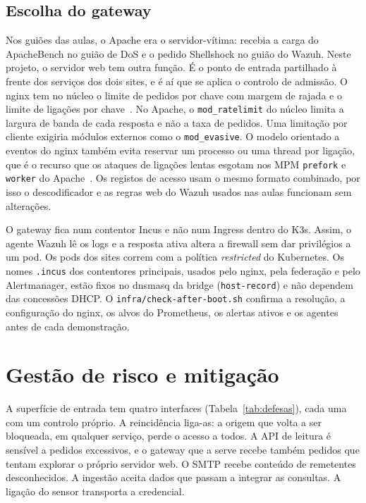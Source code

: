 \documentclass[conference,a4paper]{IEEEtran}
\newcommand{\code}[1]{\texttt{\small #1}}
\begin{document}
\subsection{Escolha do gateway}
Nos guiões das aulas, o Apache era o servidor-vítima: recebia a carga do ApacheBench no guião de DoS e o pedido Shellshock no guião do Wazuh. Neste projeto, o servidor web tem outra função. É o ponto de entrada partilhado à frente dos serviços dos dois sites, e é aí que se aplica o controlo de admissão. O nginx tem no núcleo o limite de pedidos por chave com margem de rajada e o limite de ligações por chave~\cite{nginx}. No Apache, o \code{mod\_ratelimit} do núcleo limita a largura de banda de cada resposta e não a taxa de pedidos. Uma limitação por cliente exigiria módulos externos como o \code{mod\_evasive}. O modelo orientado a eventos do nginx também evita reservar um processo ou uma thread por ligação, que é o recurso que os ataques de ligações lentas esgotam nos MPM \code{prefork} e \code{worker} do Apache~\cite{apachempm}. Os registos de acesso usam o mesmo formato combinado, por isso o descodificador e as regras web do Wazuh usados nas aulas funcionam sem alterações.

O gateway fica num contentor Incus e não num Ingress dentro do K3s. Assim, o agente Wazuh lê os logs e a resposta ativa altera a firewall sem dar privilégios a um pod. Os pods dos sites correm com a política \emph{restricted} do Kubernetes. Os nomes \code{.incus} dos contentores principais, usados pelo nginx, pela federação e pelo Alertmanager, estão fixos no dnsmasq da bridge (\code{host-record}) e não dependem das concessões DHCP. O \code{infra/check-after-boot.sh} confirma a resolução, a configuração do nginx, os alvos do Prometheus, os alertas ativos e os agentes antes de cada demonstração.


\section{Gestão de risco e mitigação}
A superfície de entrada tem quatro interfaces (Tabela~\ref{tab:defesas}), cada uma com um controlo próprio. A reincidência liga-as: a origem que volta a ser bloqueada, em qualquer serviço, perde o acesso a todos. A API de leitura é sensível a pedidos excessivos, e o gateway que a serve recebe também pedidos que tentam explorar o próprio servidor web. O SMTP recebe conteúdo de remetentes desconhecidos. A ingestão aceita dados que passam a integrar as consultas. A ligação do sensor transporta a credencial.
\end{document}
